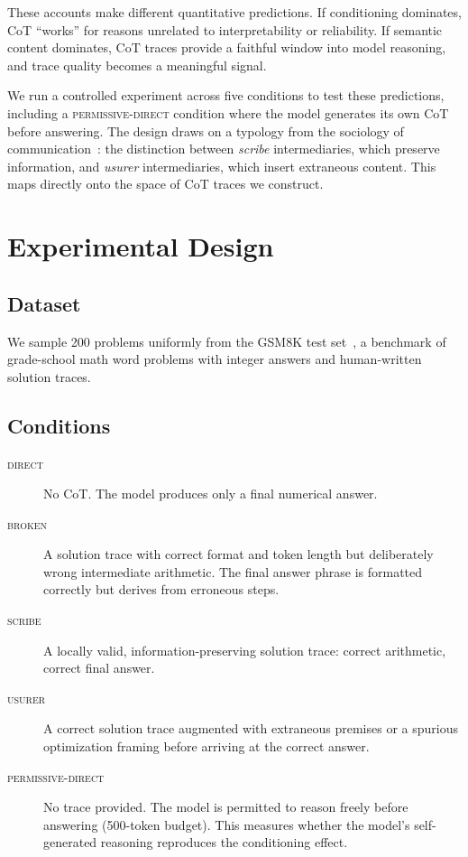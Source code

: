 \documentclass[11pt]{article}
\begin{document}
These accounts make different quantitative predictions. If conditioning dominates, CoT
``works'' for reasons unrelated to interpretability or reliability. If semantic content
dominates, CoT traces provide a faithful window into model reasoning, and trace quality
becomes a meaningful signal.

We run a controlled experiment across five conditions to test these predictions, including a
\textsc{permissive-direct} condition where the model generates its own CoT before answering.
The design draws on a typology from the sociology of communication~\citep{latour1984irreductions,attali1984illusions}:
the distinction between \emph{scribe} intermediaries, which preserve information, and
\emph{usurer} intermediaries, which insert extraneous content. This maps directly onto the
space of CoT traces we construct.

\section{Experimental Design}

\subsection{Dataset}

We sample 200 problems uniformly from the GSM8K test set~\citep{cobbe2021gsm8k}, a benchmark
of grade-school math word problems with integer answers and human-written solution traces.

\subsection{Conditions}

\begin{description}
\item[\textsc{direct}] No CoT. The model produces only a final numerical answer.
\item[\textsc{broken}] A solution trace with correct format and token length but deliberately
    wrong intermediate arithmetic. The final answer phrase is formatted correctly but derives
    from erroneous steps.
\item[\textsc{scribe}] A locally valid, information-preserving solution trace: correct
    arithmetic, correct final answer.
\item[\textsc{usurer}] A correct solution trace augmented with extraneous premises or a
    spurious optimization framing before arriving at the correct answer.
\item[\textsc{permissive-direct}] No trace provided. The model is permitted to reason freely
    before answering (500-token budget). This measures whether the model's self-generated
    reasoning reproduces the conditioning effect.
\end{description}
\end{document}
